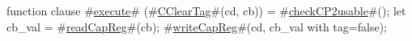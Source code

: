 function clause #\hyperref[zexecute]{execute}# (#\hyperref[zCClearTag]{CClearTag}#(cd, cb)) =
{
  #\hyperref[zcheckCP2usable]{checkCP2usable}#();
  let cb_val = #\hyperref[zreadCapReg]{readCapReg}#(cb);
  #\hyperref[zwriteCapReg]{writeCapReg}#(cd, {cb_val with tag=false});
}
